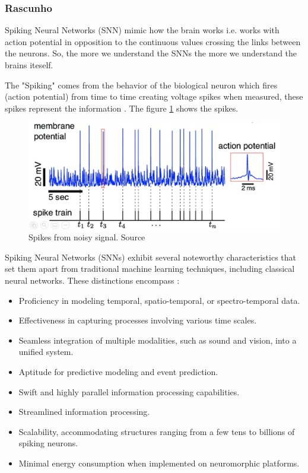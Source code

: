 \begin{frame}[allowframebreaks]
	\frametitle{Rascunho}
	\par Spiking Neural Networks (SNN) mimic how the brain works i.e. works with action potential in opposition to the continuous values crossing the links between the neurons. So, the more we understand the SNNs the more we understand the brains iteself.
	
	\par The "Spiking" comes from the behavior of the biological neuron which fires (action potential) from time to time creating voltage spikes when measured, these spikes represent the information \cite{kasabov2019time}. The figure \ref{fig:neuronspikes} shows the spikes.
	
	\begin{figure}
		\centering
		\includegraphics[width=0.6\linewidth]{images/neuronSpikes}
		\caption{Spikes from noisy signal. Source \cite{dan_goodman_2022_7044500}}
		\label{fig:neuronspikes}
	\end{figure}

	\par Spiking Neural Networks (SNNs) exhibit several noteworthy characteristics that set them apart from traditional machine learning techniques, including classical neural networks. These distinctions encompass \cite{kasabov2019time}:
	
	\begin{itemize}
		\item Proficiency in modeling temporal, spatio-temporal, or spectro-temporal data.
		\item Effectiveness in capturing processes involving various time scales.
		\item Seamless integration of multiple modalities, such as sound and vision, into a unified system.
		\item Aptitude for predictive modeling and event prediction.
		\item Swift and highly parallel information processing capabilities.
		\item Streamlined information processing.
		\item Scalability, accommodating structures ranging from a few tens to billions of spiking neurons.
		\item Minimal energy consumption when implemented on neuromorphic platforms.
	\end{itemize}


\end{frame}
